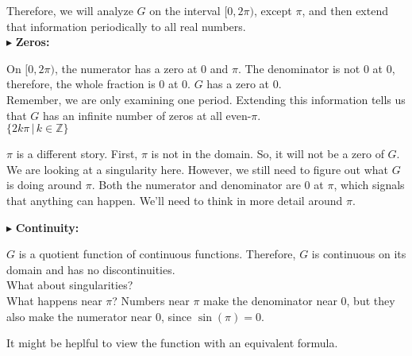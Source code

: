 \documentclass{ximera}
\begin{document}
Therefore, we will analyze $G$ on the interval $[0, 2\pi)$, except $\pi$, and then extend that information periodically to all real numbers.\\










$\blacktriangleright$ \textbf{\textcolor{blue!55!black}{Zeros: }}  


On $[0, 2\pi)$, the numerator has a zero at $0$ and $\pi$.   The denominator is not $0$ at $0$, therefore, the whole fraction is $0$ at $0$.  $G$ has a zero at $0$. \\

Remember, we are only examining one period.  Extending this information tells us that $G$ has an infinite number of zeros at all even-$\pi$. \\



$\{  2k \pi \, | \, k \in \mathbb{Z}   \}$





$\pi$ is a different story.  First, $\pi$ is not in the domain. So, it will not be a zero of $G$. \\


We are looking at a singularity here. However, we still need to figure out what $G$ is doing around $\pi$. Both the numerator and denominator are $0$ at $\pi$, which signals that anything can happen.  We'll need to think in more detail around $\pi$.










$\blacktriangleright$ \textbf{\textcolor{blue!55!black}{Continuity: }}  


$G$ is a quotient function of continuous functions.  Therefore, $G$ is continuous on its domain and has no discontinuities. \\

What about singularities? \\






What happens near $\pi$?  Numbers near $\pi$ make the denominator near $0$, but they also make the numerator near $0$, since $\sin(\pi)=0$.

It might be heplful to view the function with an equivalent formula.
\end{document}
